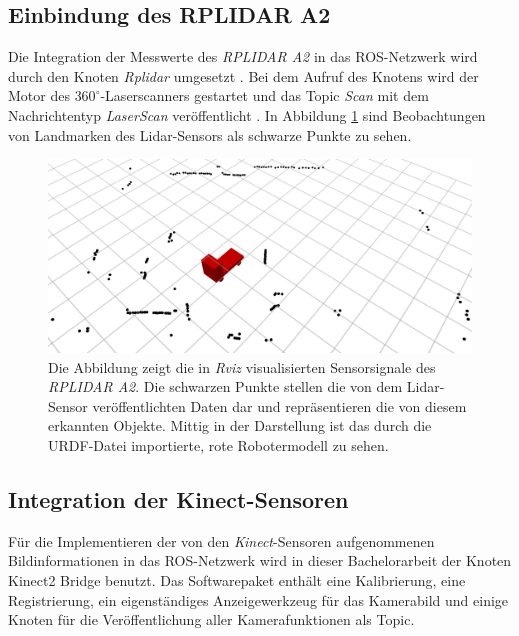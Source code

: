 		    \subsection{Einbindung des RPLIDAR A2}
		    \label{subsubsec: Übersetzen der Laserdaten}
		    	
		    	Die Integration der Messwerte des \textit{RPLIDAR A2} in das ROS-Netzwerk wird durch den Knoten \textit{Rplidar} umgesetzt \cite{lidar}. Bei dem Aufruf des Knotens wird der Motor des $360^\circ$-Laserscanners gestartet und das Topic \textit{Scan} mit dem Nachrichtentyp \textit{LaserScan} veröffentlicht \cite{lidar}. In Abbildung \ref{fig: Laserscan des RPLIDAR in Rviz} sind Beobachtungen von Landmarken des Lidar-Sensors als schwarze Punkte zu sehen.
		    	
		    	\begin{figure}[H]
		    		\centering
		    		\includegraphics[width=1.0\textwidth]{Bilder/laserscan.png}
		    		\caption{Die Abbildung zeigt die in \textit{Rviz} visualisierten Sensorsignale des \textit{RPLIDAR A2}. Die schwarzen Punkte stellen die von dem Lidar-Sensor veröffentlichten Daten dar und repräsentieren die von diesem erkannten Objekte. Mittig in der Darstellung ist das durch die URDF-Datei importierte, rote Robotermodell zu sehen. }
		    		\label{fig: Laserscan des RPLIDAR in Rviz}
		    	\end{figure}
		    
		    	
		    \subsection{Integration der Kinect-Sensoren}
		    \label{subsubsec: Kinect-Sensor}	    
		    
		    	Für die Implementieren der von den \textit{Kinect}-Sensoren aufgenommenen Bildinformationen in das ROS-Netzwerk wird in dieser Bachelorarbeit der Knoten \glqq Kinect2 Bridge\grqq{} benutzt. Das Softwarepaket enthält eine Kalibrierung, eine Registrierung, ein eigenständiges Anzeigewerkzeug für das Kamerabild und einige Knoten für die Veröffentlichung aller Kamerafunktionen als Topic. 
		    	
